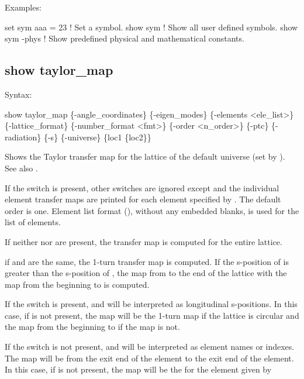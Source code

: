 {{{{{{{{{{Examples:
\begin{example}
  set sym aaa = 23  ! Set a symbol.
  show sym          ! Show all user defined symbols.
  show sym -phys    ! Show predefined physical and mathematical constants.
\end{example}


\subsection{show taylor_map}
\label{s:show.taylor}

Syntax:
\begin{example}
  show taylor_map \{-angle_coordinates\} \{-eigen_modes\} \{-elements <ele_list>\} 
            \{-lattice_format\} \{-number_format <fmt>\} \{-order <n_order>\} 
            \{-ptc\} \{-radiation\} \{-s\} \{-universe\} \{loc1 \{loc2\}\}
\end{example}

Shows the Taylor transfer map for the  lattice of the default universe (set by
). See also .

If the  switch is present, other switches are ignored except  and the
individual element transfer maps are printed for each element specified by . The
default order is one. Element list format (), without any embedded blanks,
is used for the  list of elements.

If neither  nor  are present, the transfer map is computed for the
entire lattice.

if  and  are the same, the 1-turn transfer map is computed. If the
s-position of  is greater than the s-position of , the map from
 to the end of the lattice with the map from the beginning to  is
computed.

If the  switch is present,  and  will be interpreted as longitudinal
s-positions. In this case, if  is not present, the map will be the 1-turn map if the
lattice is circular and the map from the beginning to  if the map is not.

If the  switch is not present,  and  will be interpreted as element names
or indexes. The map will be from the exit end of the  element to the exit end of the
 element. In this case, if  is not present, the map will be the for the element
given by 

}}}}}}}}}}
